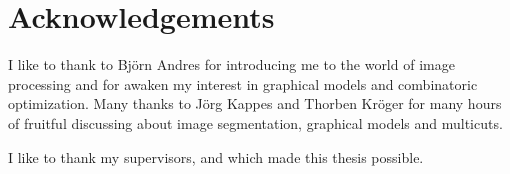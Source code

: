 




\begingroup

\let\clearpage\relax
\let\cleardoublepage\relax
\let\cleardoublepage\relax

\chapter*{Acknowledgements} %

\noindent I like to thank to Bj\"orn Andres for introducing me to the world of image processing 
and for awaken my interest in graphical models and combinatoric optimization.
\noindent Many thanks to J\"org Kappes and Thorben Kr\"oger  for many hours of fruitful discussing about image segmentation,
graphical models and multicuts.

I like to thank my supervisors, \myProf and \myOtherProf which made this thesis possible.


\endgroup